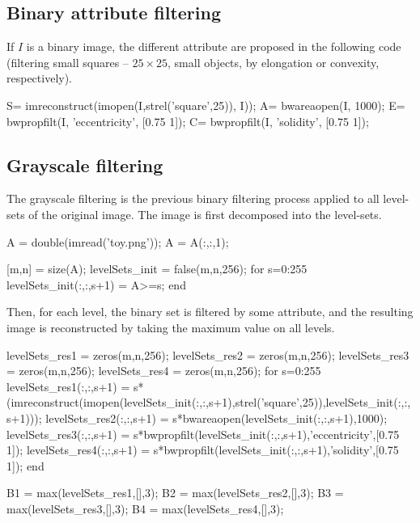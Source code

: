 \def\QRCODE{MASTER_mispa_TUT.IMG.morphological_attribute_filtering_matlabqrcode.png}
\def\QRPAGE{http://www.iptutorials.science/tree/master/MASTER_mispa/TUT.IMG.morphological_attribute_filtering/matlab}

\subsection{Binary attribute filtering}
If $I$ is a binary image, the different attribute are proposed in the following code (filtering small squares -- $25\times 25$, small objects, by elongation or convexity, respectively).

\begin{matlab}
S= imreconstruct(imopen(I,strel('square',25)), I));
A= bwareaopen(I, 1000);
E= bwpropfilt(I, 'eccentricity', [0.75 1]);
C= bwpropfilt(I, 'solidity', [0.75 1]);
\end{matlab}

\subsection{Grayscale filtering}
The grayscale filtering is the previous binary filtering process applied to all level-sets of the original image. The image is first decomposed into the level-sets.

\begin{matlab}
A = double(imread('toy.png'));
A = A(:,:,1);

[m,n] = size(A);
levelSets_init = false(m,n,256);
for s=0:255
    levelSets_init(:,:,s+1) = A>=s;
end
\end{matlab}

Then, for each level, the binary set is filtered by some attribute, and the resulting image is reconstructed by taking the maximum value on all levels.
\begin{matlab}
levelSets_res1 = zeros(m,n,256);
levelSets_res2 = zeros(m,n,256);
levelSets_res3 = zeros(m,n,256);
levelSets_res4 = zeros(m,n,256);
for s=0:255
    levelSets_res1(:,:,s+1) = s*(imreconstruct(imopen(levelSets_init(:,:,s+1),strel('square',25)),levelSets_init(:,:,s+1)));
    levelSets_res2(:,:,s+1) = s*bwareaopen(levelSets_init(:,:,s+1),1000);
    levelSets_res3(:,:,s+1) = s*bwpropfilt(levelSets_init(:,:,s+1),'eccentricity',[0.75 1]);
    levelSets_res4(:,:,s+1) = s*bwpropfilt(levelSets_init(:,:,s+1),'solidity',[0.75 1]);
end

B1 = max(levelSets_res1,[],3);
B2 = max(levelSets_res2,[],3);
B3 = max(levelSets_res3,[],3);
B4 = max(levelSets_res4,[],3);
\end{matlab}

